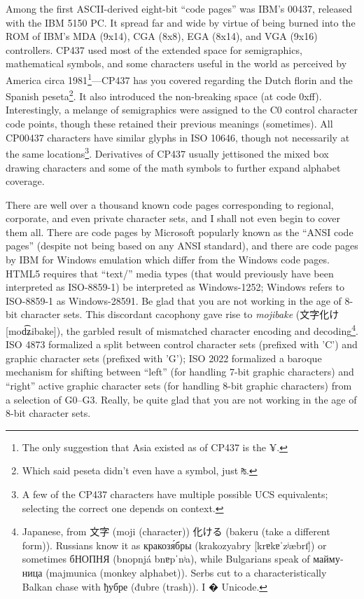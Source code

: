 Among the first ASCII-derived eight-bit ``code pages'' was IBM's 00437, released
with the IBM 5150 PC. It spread far and wide by virtue of being burned into the
ROM of IBM's MDA (9x14), CGA (8x8), EGA (8x14), and VGA (9x16) controllers.
CP437 used most of the extended space for semigraphics, mathematical symbols,
and some characters useful in the world as perceived by America circa 1981\footnote{The
 only suggestion that Asia existed as of CP437 is the ¥.}---CP437 has you
covered regarding the Dutch florin and the Spanish peseta\footnote{Which said
peseta didn't even have a symbol, just \texttt{₧}.}. It also introduced
the non-breaking space (at code 0xff). Interestingly, a melange of semigraphics
were assigned to the C0 control character code points, though these retained
their previous meanings (sometimes). All CP00437 characters have similar
glyphs in ISO 10646, though not necessarily at the same locations\footnote{A few
of the CP437 characters have multiple possible UCS equivalents;
selecting the correct one depends on context.}. Derivatives of CP437
usually jettisoned the mixed box drawing characters and some of the math
symbols to further expand alphabet coverage.

There are well over a thousand known code pages corresponding to regional,
corporate, and even private character sets, and I shall not even begin to
cover them all. There are code pages by Microsoft popularly known as the ``ANSI
code pages'' (despite not being based on any ANSI standard), and there are code
pages by IBM for Windows emulation which differ from the Windows code pages.
HTML5 requires that ``text/'' media types (that would previously have been interpreted
as ISO-8859-1) be interpreted as Windows-1252; Windows refers to
ISO-8859-1 as Windows-28591. Be glad that you are not working in the age of
8-bit character sets. This discordant cacophony gave rise to \textit{mojibake}
(文字化け [{mod͡ʑibake}]), the garbled result of
mismatched character encoding and decoding\footnote{Japanese, from 文字 (moji
(character)) 化ける (bakeru (take a different form)). Russians know it as
\textrussian{кракозя́бры} (krakozyabry [{krɐkɐˈzʲæbrɪ̈}]) or sometimes \textrussian{бНОПНЯ} (bnopnjá
{bnɐpˈnʲa}), while Bulgarians speak of
\textbulgarian{маймуница} (majmunica (monkey alphabet)). Serbs cut to a
characteristically Balkan chase with \textrussian{ђубре} (đubre (trash)). I
{�} Unicode.}. ISO 4873\cite{iso4873} formalized a
split between control character sets (prefixed with 'C') and graphic character
sets (prefixed with 'G'); ISO 2022 formalized a baroque mechanism for shifting
between ``left'' (for handling 7-bit graphic characters) and ``right'' active
graphic character sets (for handling 8-bit graphic characters) from a selection
of G0--G3. Really, be quite glad that you are not working in the age of 8-bit
character sets.

